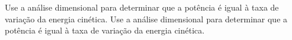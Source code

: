 Use a análise dimensional para determinar que a potência é igual à taxa de variação da energia cinética.
Use a análise dimensional para determinar que a potência é igual à taxa de variação da energia cinética.

